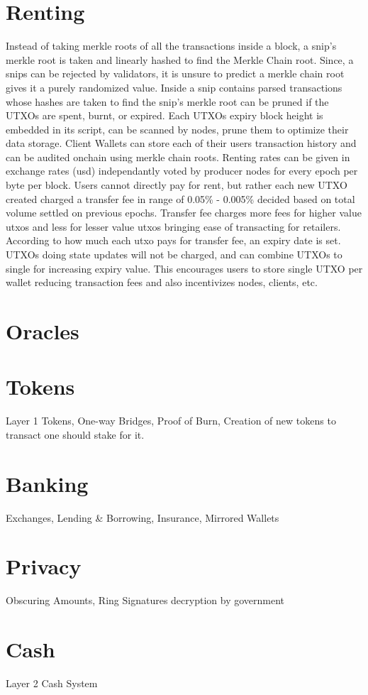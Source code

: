 \documentclass[a4paper,10pt]{article}
\begin{document}
\section{Renting}
Instead of taking merkle roots of all the transactions inside a block, a snip's merkle root is taken and linearly hashed to find the Merkle Chain root. Since, a snips can be rejected by validators, it is unsure to predict a merkle chain root gives it a purely randomized value. Inside a snip contains parsed transactions whose hashes are taken to find the snip's merkle root can be pruned if the UTXOs are spent, burnt, or expired. Each UTXOs expiry block height is embedded in its script, can be scanned by nodes, prune them to optimize their data storage. Client Wallets can store each of their users transaction history and can be audited onchain using merkle chain roots. Renting rates can be given in exchange rates (usd) independantly voted by producer nodes for every epoch per byte per block. Users cannot directly pay for rent, but rather each new UTXO created charged a transfer fee in range of 0.05\% - 0.005\% decided based on total volume settled on previous epochs. Transfer fee charges more fees for higher value utxos and less for lesser value utxos bringing ease of transacting for retailers. According to how much each utxo pays for transfer fee, an expiry date is set. UTXOs doing state updates will not be charged, and can combine UTXOs to single for increasing expiry value. This encourages users to store single UTXO per wallet reducing transaction fees and also incentivizes nodes, clients, etc.  
\section{Oracles}
\section{Tokens}
Layer 1 Tokens, One-way Bridges, Proof of Burn, Creation of new tokens to transact one should stake for it.
\section{Banking}
Exchanges, Lending \& Borrowing, Insurance, Mirrored Wallets
\section{Privacy}
Obscuring Amounts, Ring Signatures decryption by government
\section{Cash}
Layer 2 Cash System 
\end{document}
